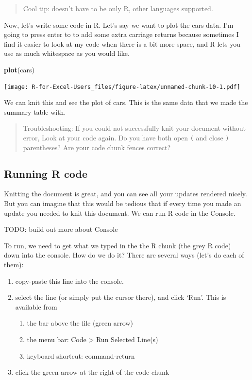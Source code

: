 \documentclass[]{book}
\newenvironment{Shaded}{\begin{snugshade}}{\end{snugshade}}
\newcommand{\KeywordTok}[1]{\textcolor[rgb]{0.13,0.29,0.53}{\textbf{#1}}}
\newcommand{\NormalTok}[1]{#1}
\providecommand{\tightlist}{%
  \setlength{\itemsep}{0pt}\setlength{\parskip}{0pt}}
\begin{document}
\begin{quote}
Cool tip: doesn't have to be only R, other languages supported.
\end{quote}

Now, let's write some code in R. Let's say we want to plot the cars data. I'm going to press enter to to add some extra carriage returns because sometimes I find it easier to look at my code when there is a bit more space, and R lets you use as much whitespace as you would like.

\begin{Shaded}
\begin{Highlighting}[]
\KeywordTok{plot}\NormalTok{(cars)}
\end{Highlighting}
\end{Shaded}

\texttt{[image: R-for-Excel-Users\_files/figure-latex/unnamed-chunk-10-1.pdf]}

We can knit this and see the plot of cars. This is the same data that we made the summary table with.

\begin{quote}
Troubleshooting: If you could not successfully knit your document without error, Look at your code again. Do you have both open \texttt{(} and close \texttt{)} parentheses? Are your code chunk fences correct?
\end{quote}

\hypertarget{running-r-code}{%
\subsection{Running R code}\label{running-r-code}}

Knitting the document is great, and you can see all your updates rendered nicely. But you can imagine that this would be tedious that if every time you made an update you needed to knit this document. We can run R code in the Console.

TODO: build out more about Console

To run, we need to get what we typed in the the R chunk (the grey R code) down into the console. How do we do it? There are several ways (let's do each of them):

\begin{enumerate}
\def\labelenumi{\arabic{enumi}.}
\tightlist
\item
  copy-paste this line into the console.
\item
  select the line (or simply put the cursor there), and click `Run'. This is available from

  \begin{enumerate}
  \def\labelenumii{\alph{enumii}.}
  \tightlist
  \item
    the bar above the file (green arrow)
  \item
    the menu bar: Code \textgreater{} Run Selected Line(s)
  \item
    keyboard shortcut: command-return
  \end{enumerate}
\item
  click the green arrow at the right of the code chunk
\end{enumerate}
\end{document}
